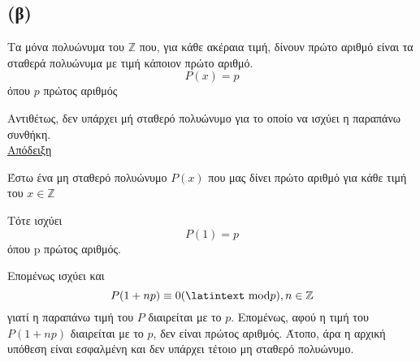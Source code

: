 \documentclass[a4paper, 11pt]{article}
\newcommand{\lt}{\latintext}
\begin{document}
\subsection*{(β)} Τα μόνα πολυώνυμα του $\mathbb{Z}$ που, για κάθε ακέραια τιμή, δίνουν πρώτο αριθμό είναι τα σταθερά πολυώνυμα με τιμή κάποιον πρώτο αριθμό.
\[P(x) = p\] όπου $p$ πρώτος αριθμός

Αντιθέτως, δεν υπάρχει μή σταθερό πολυώνυμο για το οποίο να ισχύει η παραπάνω συνθήκη.\\

\underline{Απόδειξη}

Έστω ένα μη σταθερό πολυώνυμο $P(x)$ που μας δίνει πρώτο αριθμό για κάθε τιμή του $x \in \mathbb{Z}$

Τότε ισχύει
\[P(1) = p\]
όπου p πρώτος αριθμός.

Επομένως ισχύει και
\[P(1 + np) \equiv 0 ( \textrm{\lt mod} p), n \in \mathbb{Z} \]
γιατί η παραπάνω τιμή του $P$ διαιρείται με το $p$. Επομένως, αφού η τιμή του $P(1+np)$ διαιρείται με το $p$, δεν είναι πρώτος αριθμός. Άτοπο, άρα η αρχική υπόθεση είναι εσφαλμένη και δεν υπάρχει τέτοιο μη σταθερό πολυώνυμο.
\end{document}
